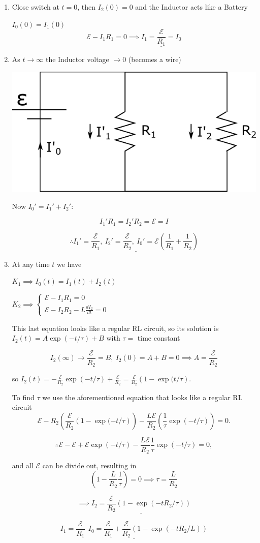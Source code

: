 \begin{enumerate}
	\item Close switch at $t=0$, then
	$I_2(0)=0$ and the
	Inductor acts like a Battery
	
	$I_0(0)=I_1(0)$
	$$\mathcal{E} - I_1R_1=0 \implies \underline{I_1=\frac{\mathcal{E}}{R_1}=I_0}$$
	
	\item As $t\rightarrow \infty$ the Inductor voltage $\rightarrow 0$ (becomes a wire)
	
	\vspace{5mm}
	\includegraphics[width=0.4\linewidth]{Images/P10img3.png}
	\vspace{5mm}
	
	Now $I_0' = I_1' +I_2'$:
	
	$$I_1'R_1=I_2'R_2=\mathcal{E}=I$$
	
	$$\therefore \underline{I_1'=\frac{\mathcal{E}}{R_1}, \: I_2'=\frac{\mathcal{E}}{R_2}, \: I_0'=\mathcal{E}\left(\frac{1}{R_1}+\frac{1}{R_2}\right)}$$
	
	
	\item At any time $t$ we have
	
	$K_1 \implies I_0(t) = I_1(t)+I_2(t)$
	
	$K_2 \implies \begin{cases}
		\mathcal{E} - I_1R_1 = 0\\
		\mathcal{E} - I_2R_2 -L\frac{dI_2}{dt}=0
	\end{cases} $
	\vspace{5mm}
	
	This last equation looks like a regular RL circuit, so its solution is $I_2(t)=A\exp(-t/\tau)+B$ with $\tau=$ time constant
	
	$$I_2(\infty)\rightarrow \frac{\mathcal{E}}{R_2}=B, \: I_2(0)=A+B=0 \implies A=\frac{\mathcal{E}}{R_2}$$
	
	so $I_2(t)=-\frac{\mathcal{E}}{R_2}\exp(-t/\tau)+\frac{\mathcal{E}}{R_2}=\frac{\mathcal{E}}{R_2}\left(1-\exp(t/\tau\right)$.
	\vspace{5mm}
	
	To find $\tau$ we use the aforementioned equation that looks like a regular RL circuit
	$$\mathcal{E}-R_2\left(\frac{\mathcal{E}}{R_2}\left(1-\exp(-t/\tau\right)\right)-\frac{L\mathcal{E}}{R_2}\left(\frac{1}{\tau}\exp(-t/\tau)\right)=0.$$
	
	$$\therefore \mathcal{E} - \mathcal{E} + \mathcal{E}\exp(-t/\tau)-\frac{L\mathcal{E}}{R_2}\frac{1}{\tau}\exp(-t/\tau)=0,$$
	
	and all $\mathcal{E}$ can be divide out, resulting in
	$$\left(1-\frac{L}{R_2}\frac{1}{\tau}\right)=0 \implies \tau = \frac{L}{R_2}$$
	
	$$\implies \underline{I_2= \frac{\mathcal{E}}{R_2}(1-\exp(-tR_2/\tau))}$$
	
	$$\underline{I_1=\frac{\mathcal{E}}{R_1} \:\: I_0=\frac{\mathcal{E}}{R_1}+\frac{\mathcal{E}}{R_2}\left(1-\exp(-tR_2/L)\right)}$$
\end{enumerate}